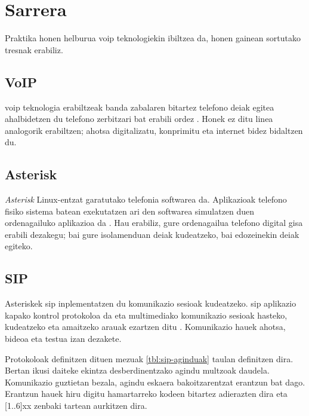 \chapter{Sarrera}

\localtableofcontents

Praktika honen helburua \gls{voip} teknologiekin ibiltzea da, honen gainean sortutako tresnak erabiliz.

\section{VoIP}

\gls{voip} teknologia erabiltzeak banda zabalaren bitartez telefono deiak egitea ahalbidetzen du telefono zerbitzari bat erabili ordez \autocite{nextiva_voip}. Honek ez ditu linea analogorik erabiltzen; ahotsa digitalizatu, konprimitu eta internet bidez bidaltzen du.

\section{Asterisk}

\textit{Asterisk} Linux-entzat garatutako telefonia softwarea da. Aplikazioak telefono fisiko sistema batean exekutatzen ari den softwarea simulatzen duen ordenagailuko aplikazioa da \autocite{asterisk_history}. Hau erabiliz, gure ordenagailua telefono digital gisa erabili dezakegu; bai gure isolamenduan deiak kudeatzeko, bai edozeinekin deiak egiteko.

\section{SIP}

Asteriskek \gls{sip} inplementatzen du komunikazio sesioak kudeatzeko. \gls{sip} aplikazio kapako kontrol protokoloa da eta multimediako komunikazio sesioak hasteko, kudeatzeko eta amaitzeko arauak ezartzen ditu \autocite{rosenberg2002sip}. Komunikazio hauek ahotsa, bideoa eta testua izan dezakete.

Protokoloak definitzen dituen mezuak \autoref{tbl:sip-aginduak} taulan definitzen dira. Bertan ikusi daiteke ekintza desberdinentzako agindu multzoak daudela. Komunikazio guztietan bezala, agindu eskaera bakoitzarentzat erantzun bat dago. Erantzun hauek hiru digitu hamartarreko kodeen bitartez adierazten dira eta [1..6]xx zenbaki tartean aurkitzen dira.

